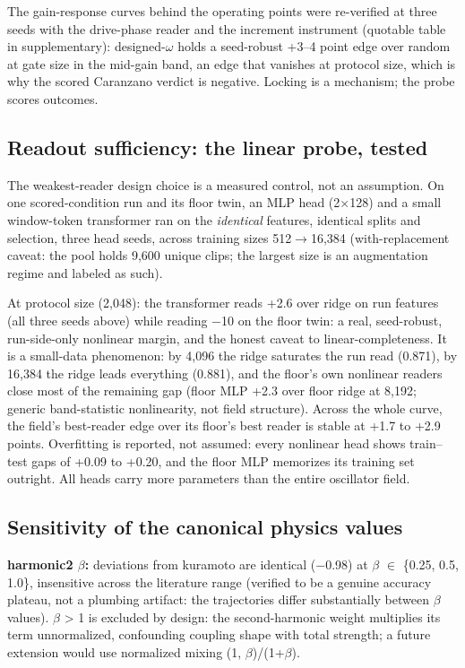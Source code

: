 \documentclass[10pt]{article}
\begin{document}
The gain-response curves behind the operating points were re-verified at
three seeds with the drive-phase reader and the increment instrument
(quotable table in supplementary): designed-\ensuremath{\omega} holds a
seed-robust +3--4 point edge over random at gate size in the mid-gain
band, an edge that vanishes at protocol size, which is why the scored
Caranzano verdict is negative. Locking is a mechanism; the probe scores
outcomes.

\subsection{Readout sufficiency: the linear probe,
tested}\label{readout-sufficiency-the-linear-probe-tested}

The weakest-reader design choice is a measured control, not an
assumption. On one scored-condition run and its floor twin, an MLP head
(2\ensuremath{\times}128) and a small window-token transformer ran on
the \emph{identical} features, identical splits and selection, three
head seeds, across training sizes 512\ensuremath{\to}16,384
(with-replacement caveat: the pool holds 9,600 unique clips; the largest
size is an augmentation regime and labeled as such).

At protocol size (2,048): the transformer reads +2.6 over ridge on run
features (all three seeds above) while reading \ensuremath{-}10 on the
floor twin: a real, seed-robust, run-side-only nonlinear margin, and the
honest caveat to linear-completeness. It is a small-data phenomenon: by
4,096 the ridge saturates the run read (0.871), by 16,384 the ridge
leads everything (0.881), and the floor's own nonlinear readers close
most of the remaining gap (floor MLP +2.3 over floor ridge at 8,192;
generic band-statistic nonlinearity, not field structure). Across the
whole curve, the field's best-reader edge over its floor's best reader
is stable at +1.7 to +2.9 points. Overfitting is reported, not assumed:
every nonlinear head shows train--test gaps of +0.09 to +0.20, and the
floor MLP memorizes its training set outright. All heads carry more
parameters than the entire oscillator field.

\subsection{Sensitivity of the canonical physics
values}\label{sensitivity-of-the-canonical-physics-values}

\textbf{harmonic2 \ensuremath{\beta}:} deviations from kuramoto are
identical (\ensuremath{-}0.98) at \ensuremath{\beta} \ensuremath{\in}
\{0.25, 0.5, 1.0\}, insensitive across the literature range
\citep{hansel1993, daido1992} (verified to be a genuine accuracy
plateau, not a plumbing artifact: the trajectories differ substantially
between \ensuremath{\beta} values). \ensuremath{\beta} \textgreater{} 1
is excluded by design: the second-harmonic weight multiplies its term
unnormalized, confounding coupling shape with total strength; a future
extension would use normalized mixing (1,
\ensuremath{\beta})/(1+\ensuremath{\beta}).
\end{document}
